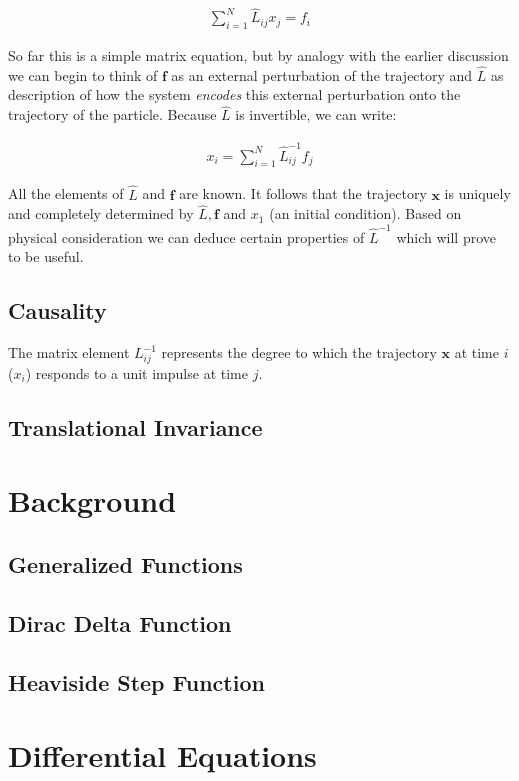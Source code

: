 \documentclass[11pt]{article}
\theoremstyle{plain}
\theoremstyle{definition}
\renewcommand{\vec}[1]{\mathbf{#1}} %
\begin{document}
\begin{align}
    \sum\limits_{i=1}^N \hat L_{ij} x_j = f_i
\end{align}

So far this is a simple matrix equation, but by analogy with the earlier discussion we can begin to think of $\vec f$ as an external perturbation of the trajectory and $\hat L$ as description of how the system \textit{encodes} this external perturbation onto the trajectory of the particle. Because $\hat L$ is invertible, we can write:

\begin{align}
    x_i = \sum\limits_{i=1}^N \hat L_{ij}^{-1} f_j
\end{align}

All the elements of $\hat L$ and $\vec f$ are known. It follows that the trajectory $\vec x$ is uniquely and completely determined by $\hat L, \vec f$ and $x_1$ (an initial condition). Based on physical consideration we can deduce certain properties of $\hat L^{-1}$ which will prove to be useful.

\subsection{Causality}

The matrix element $L_{ij}^{-1}$ represents the degree to which the trajectory $\vec x$ at time $i$ ($x_i$)  responds to a unit impulse at time $j$.

\subsection{Translational Invariance}

\section{Background}
\subsection{Generalized Functions}
\subsection{Dirac Delta Function}
\subsection{Heaviside Step Function}


\section{Differential Equations}
\end{document}
